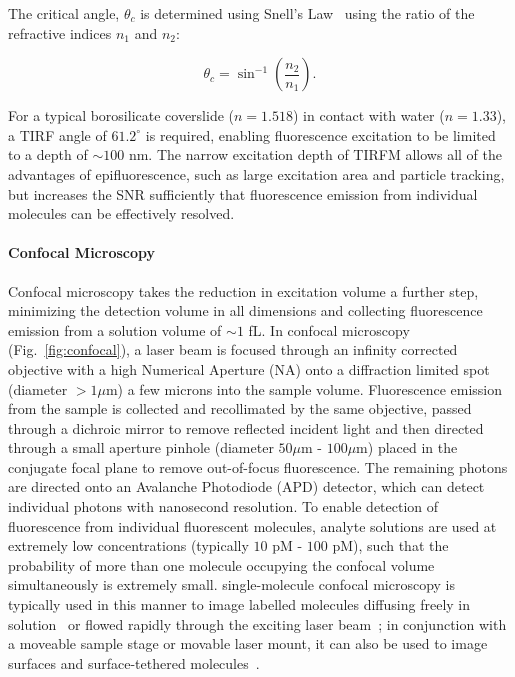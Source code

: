 The critical angle, $\theta_c$ is determined using Snell's Law~\cite{Wolf1995} using the ratio of the refractive indices $n_1$ and $n_2$:

\begin{equation}
\theta_c = \sin^{-1}\left(\frac{n_2}{n_1}\right).
\label{eq:snell}
\end{equation}

For a typical borosilicate coverslide ($n = 1.518$) in contact with water ($n = 1.33$), a TIRF angle of $61.2^{\circ}$ is required, enabling fluorescence excitation to be limited to a depth of $\sim 100$ nm. The narrow excitation depth of TIRFM allows all of the advantages of epifluorescence, such as large excitation area and particle tracking, but increases the SNR sufficiently that fluorescence emission from individual molecules can be effectively resolved.

\paragraph{Confocal Microscopy}
Confocal microscopy takes the reduction in excitation volume a further step, minimizing the detection volume in all dimensions and collecting fluorescence emission from a solution volume of $\sim 1$ fL. In confocal microscopy (Fig.~\ref{fig:confocal}), a laser beam is focused through an infinity corrected objective with a high Numerical Aperture (NA) onto a diffraction limited spot (diameter $> 1 \mu$m) a few microns into the sample volume. Fluorescence emission from the sample is collected and recollimated by the same objective, passed through a dichroic mirror to remove reflected incident light and then directed through a small aperture pinhole (diameter $50 \mu$m - $100 \mu$m) placed in the conjugate focal plane to remove out-of-focus fluorescence. The remaining photons are directed onto an Avalanche Photodiode (APD) detector, which can detect individual photons with nanosecond resolution. To enable detection of fluorescence from individual fluorescent molecules, analyte solutions are used at extremely low concentrations (typically $10$ pM - $100$ pM), such that the probability of more than one molecule occupying the confocal volume simultaneously is extremely small. single-molecule confocal microscopy is typically used in this manner to image labelled molecules diffusing freely in solution~\cite{weiss00} or flowed rapidly through the exciting laser beam~\cite{horrocks2012}; in conjunction with a moveable sample stage or movable laser mount, it can also be used to image surfaces and surface-tethered molecules~\cite{Brown2008}. 


